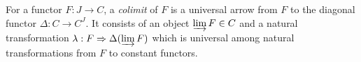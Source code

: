 For a functor $F: J \to C$, a \emph{colimit} of $F$ is a universal arrow from $F$ to the diagonal functor $\Delta: C \to C^J$. It consists of an object $\varinjlim F \in C$ and a natural transformation $\lambda: F \Rightarrow \Delta(\varinjlim F)$ which is universal among natural transformations from $F$ to constant functors.
